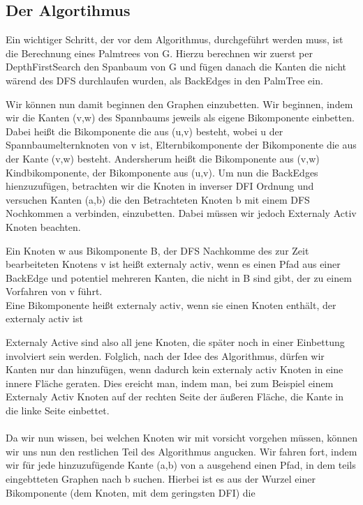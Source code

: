 \documentclass[runningheads]{llncs}
\begin{document}
    \subsection{Der Algortihmus}
    Ein wichtiger Schritt, der vor dem Algorithmus, durchgeführt werden muss, 
    ist die Berechnung eines Palmtrees von G. Hierzu berechnen wir zuerst per DepthFirstSearch 
    den Spanbaum von G und fügen danach die Kanten die nicht wärend des DFS durchlaufen wurden, als BackEdges in den PalmTree ein. 

    Wir können nun damit beginnen den Graphen einzubetten. Wir beginnen, indem wir die Kanten (v,w) des Spannbaums jeweils als eigene Bikomponente einbetten.
    Dabei heißt die Bikomponente die aus (u,v) besteht, wobei u der Spannbaumelternknoten von v ist, Elternbikomponente der Bikomponente die aus der Kante (v,w) besteht.
    Andersherum heißt die Bikomponente aus (v,w) Kindbikomponente, der Bikomponente aus (u,v). Um nun die BackEdges hienzuzufügen, betrachten wir die Knoten in inverser DFI Ordnung und versuchen Kanten (a,b) die den Betrachteten 
    Knoten b mit einem DFS Nochkommen a verbinden, einzubetten. Dabei müssen wir jedoch Externaly Activ Knoten beachten.
    \begin{definition}
        Ein Knoten w aus Bikomponente B, der DFS Nachkomme des zur Zeit bearbeiteten Knotens v ist heißt externaly activ,  
        wenn es einen Pfad aus einer BackEdge und potentiel mehreren Kanten, die nicht in B sind gibt, der zu einem Vorfahren von v führt.
        \\
        Eine Bikomponente heißt externaly activ, wenn sie einen Knoten enthält, der externaly activ ist
    \end{definition}
    Externaly Active sind also all jene Knoten, die später noch in einer Einbettung involviert sein werden. Folglich, nach der Idee des Algorithmus, dürfen
    wir Kanten nur dan hinzufügen, wenn dadurch kein externaly activ Knoten in eine innere Fläche geraten. Dies ereicht man, indem man, bei zum Beispiel einem Externaly Activ
    Knoten auf der rechten Seite der äußeren Fläche, die Kante in die linke Seite einbettet.
    \\
    \\
    Da wir nun wissen, bei welchen Knoten wir mit vorsicht vorgehen müssen, können wir uns nun den restlichen Teil des Algorithmus angucken. Wir fahren fort, indem wir für jede hinzuzufügende Kante
    (a,b) von a ausgehend einen Pfad, in dem teils eingebtteten Graphen nach b suchen. Hierbei ist es aus der Wurzel einer Bikomponente (dem Knoten, mit dem geringsten DFI) die
\end{document}
